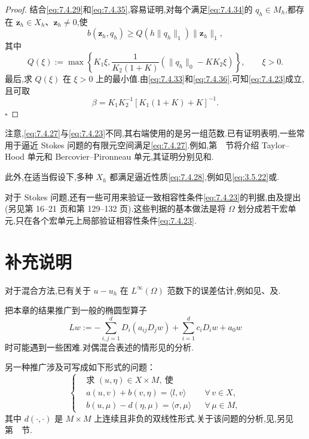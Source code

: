 \begin{proof}
结合\eqref{eq:7.4.29}和\eqref{eq:7.4.35},容易证明,对每个满足\eqref{eq:7.4.34}的 \(q_h\in M_h\),都存在 \(\boldsymbol{z}_h\in X_h\)、\(\boldsymbol{z}_h\ne0\),使
\begin{equation}\label{eq:7.4.36}
  b(\boldsymbol{z}_h,q_h)\ge Q(h\|q_h\|_1)\|\boldsymbol{z}_h\|_1,
\end{equation}
其中
\[
  Q(\xi):=\max\left\{K_1\xi,\frac{1}{K_2(1+K)}
       (\|q_h\|_0-KK_2\xi)\right\},\qquad \xi>0.
\]
最后,求 \(Q(\xi)\) 在 \(\xi>0\) 上的最小值.由\eqref{eq:7.4.33}和\eqref{eq:7.4.36},可知\eqref{eq:7.4.23}成立,且可取
\[
  \beta=K_1K_2^{-1}[K_1(1+K)+K]^{-1}.
\]
\hfill\(\square\)
\end{proof}

注意,\eqref{eq:7.4.27}与\eqref{eq:7.4.23}不同,其右端使用的是另一组范数.已有证明表明,一些常用于逼近 Stokes 问题的有限元空间满足\eqref{eq:7.4.27}.例如,第~~节将介绍 Taylor--Hood 单元和 Bercovier--Pironneau 单元,其证明分别见和.

此外,在适当假设下,多种 \(X_h\) 都满足逼近性质\eqref{eq:7.4.28},例如见\eqref{eq:3.5.22}或.

对于 Stokes 问题,还有一些可用来验证一致相容性条件\eqref{eq:7.4.23}的判据,由及提出(另见第 16–21 页和第 129–132 页).这些判据的基本做法是将 \(\Omega\) 划分成若干宏单元,只在各个宏单元上局部验证相容性条件\eqref{eq:7.4.23}.

\section{补充说明}\label{sec:7.5}

对于混合方法,已有关于 \(u-u_h\) 在 \(L^\infty(\Omega)\) 范数下的误差估计,例如见、及.

把本章的结果推广到一般的椭圆型算子
\[
  Lw:=-\sum_{i,j=1}^d D_i(a_{ij}D_jw)+\sum_{i=1}^d c_iD_iw+a_0w
\]
时可能遇到一些困难.对偶混合表述的情形见的分析.

另一种推广涉及可写成如下形式的问题：
\[
  \left\{
  \begin{aligned}
    &\text{求 }(u,\eta)\in X\times M,\ \text{使}\\
    &a(u,v)+b(v,\eta)=\langle l,v\rangle&&\forall\,v\in X,\\
    &b(u,\mu)-d(\eta,\mu)=\langle\sigma,\mu\rangle&&\forall\,\mu\in M,
  \end{aligned}
  \right.
\]
其中 \(d(\cdot,\cdot)\) 是 \(M\times M\) 上连续且非负的双线性形式.关于该问题的分析,见,另见第~~节.

